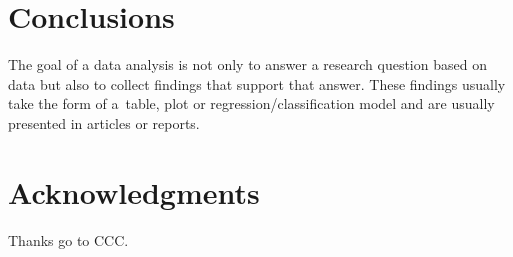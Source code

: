 \documentclass[nojss]{jss}
\begin{document}
\section{Conclusions}
\label{sec:conc4}

The goal of a data analysis is not only to answer a research question based on data but also to collect findings that support that answer. These findings usually take the form of a~table, plot or regression/classification model and are usually presented in articles or reports.

\section{Acknowledgments}

Thanks go to CCC.

%

\end{document}
